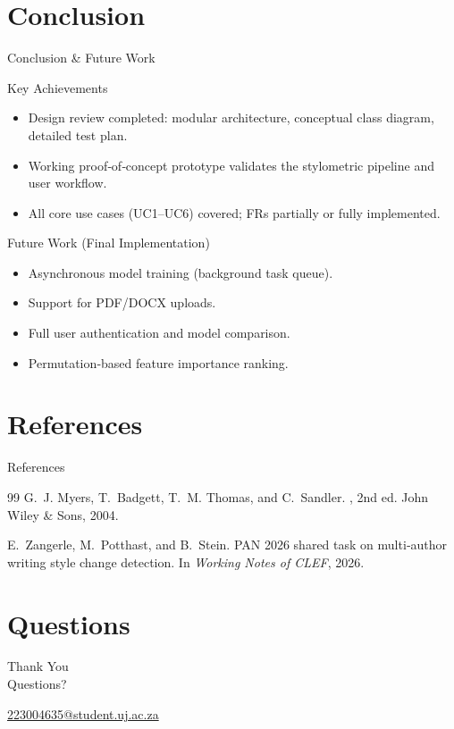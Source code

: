 \documentclass[compress,aspectratio=169]{beamer}
\begin{document}
\section{Conclusion}
\begin{frame}{Conclusion \& Future Work}
    \begin{block}{Key Achievements}
        \begin{itemize}
            \item Design review completed: modular architecture, conceptual class diagram, detailed test plan.
            \item Working proof‑of‑concept prototype validates the stylometric pipeline and user workflow.
            \item All core use cases (UC1–UC6) covered; FRs partially or fully implemented.
        \end{itemize}
    \end{block}
    \pause
    \begin{block}{Future Work (Final Implementation)}
        \begin{itemize}
            \item Asynchronous model training (background task queue).
            \item Support for PDF/DOCX uploads.
            \item Full user authentication and model comparison.
            \item Permutation‑based feature importance ranking.
        \end{itemize}
    \end{block}
\end{frame}

\section{References}
\begin{frame}[allowframebreaks]{References}
    \tiny
    \begin{thebibliography}{99}
        G.~J. Myers, T.~Badgett, T.~M. Thomas, and C.~Sandler.
        , 2nd ed.
        \newblock John Wiley \& Sons, 2004.

        E.~Zangerle, M.~Potthast, and B.~Stein.
        \newblock PAN 2026 shared task on multi‑author writing style change detection.
        \newblock In {\em Working Notes of CLEF}, 2026.
    \end{thebibliography}
\end{frame}

\section{Questions}
\begin{frame}{}
    \begin{center}
        \huge{Thank You}\\[1cm]
        \huge{Questions?}
    \end{center}
    \vspace{0.5cm}
    \begin{center}
        \url{223004635@student.uj.ac.za}
    \end{center}
\end{frame}
\end{document}
